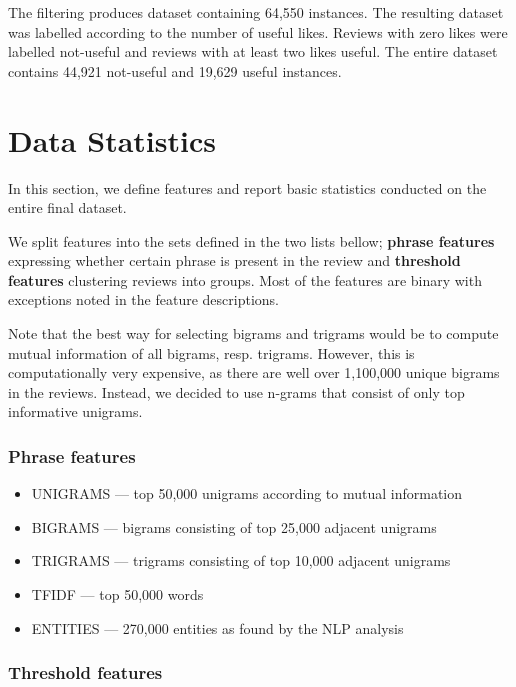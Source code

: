 The filtering produces dataset containing 64,550 instances.
The resulting dataset was labelled according to the number of useful likes.
Reviews with zero likes were labelled not-useful and
reviews with at least two likes useful.
The entire dataset contains 44,921 not-useful and
19,629 useful instances.



\section{Data Statistics}\label{sec:data_stats}

In this section, we define features
and report basic statistics conducted on the entire final dataset.

We split features into the sets defined in the two lists bellow;
\textbf{phrase features} expressing whether certain phrase is present in the review and
\textbf{threshold features} clustering reviews into groups.
Most of the features are binary with exceptions noted in the feature descriptions.

Note that the best way for selecting bigrams and trigrams would be to compute mutual information of all bigrams, resp. trigrams.
However, this is computationally very expensive, as there are well over 1,100,000 unique bigrams in the reviews.
Instead, we decided to use n-grams that consist of only top informative unigrams.

\subsubsection*{Phrase features}

\begin{itemize}
	\item UNIGRAMS --- top 50,000 unigrams according to mutual information
	\item BIGRAMS --- bigrams consisting of top 25,000 adjacent unigrams
	\item TRIGRAMS  --- trigrams consisting of top 10,000 adjacent unigrams
	\item TFIDF  --- top 50,000 words
	\item ENTITIES --- 270,000 entities as found by the NLP analysis
\end{itemize}

\subsubsection*{Threshold features}

